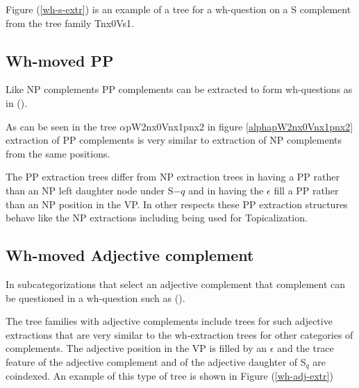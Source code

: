 
Figure (\ref{wh-s-extr}) is an example of a tree for a wh-question on
a S complement from the tree family Tnx0Vs1.

\begin{figure}[htbp]
\end{figure}


\subsection{Wh-moved PP}
Like NP complements PP complements can be extracted to form
wh-questions as in ().


As can be seen in the tree $\alpha$pW2nx0Vnx1pnx2 in figure
\ref{alphapW2nx0Vnx1pnx2} extraction of PP complements is very similar
to extraction of NP complements from the same positions.  

\begin{figure}[htbp]
\end{figure}


The PP extraction trees differ from NP extraction trees in having a PP
rather than an NP left daughter node under S$-{q}$ and in having the
$\epsilon$ fill a PP rather than an NP position in the VP. In other
respects these PP extraction structures behave like the NP extractions
including being used for Topicalization.

\subsection{Wh-moved Adjective complement}
In subcategorizations that select an adjective complement that
complement can be questioned in a wh-question such as ().


The tree families with adjective complements include trees for such
adjective extractions that are very similar to the wh-extraction trees
for other categories of complements.  The adjective position in the VP
is filled by an $\epsilon$ and the trace feature of the adjective
complement and of the adjective daughter of S$_{q}$ are coindexed.  An
example of this type of tree is shown in Figure (\ref{wh-adj-extr})

\begin{figure}[htbp]
\end{figure}







